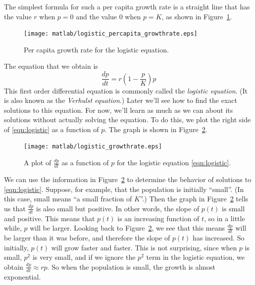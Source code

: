 The simplest formula for such a
per capita growth rate is a straight line that has
the value $r$ when $p=0$ and the value $0$ when $p=K$, as shown in
Figure~\ref{fig:growthrate}.
\begin{figure}
\centerline{\texttt{[image: matlab/logistic\_percapita\_growthrate.eps]}} 
\caption{Per capita growth rate for the logistic equation.}
\label{fig:growthrate}
\end{figure} 
The equation that we obtain is
\begin{equation}
  \frac{dp}{dt} = r\left(1-\frac{p}{K}\right)p
\label{eqn:logistic}
\end{equation}
This first order differential equation is commonly called the \emph{logistic equation}.
(It is also known as the
\emph{Verhulst equation}.)
Later we'll see how to find the exact solutions to this equation.
For now, we'll learn as much as we can about its solutions without actually solving the
equation.  To do this, we plot the right side of \eqref{eqn:logistic} as a function of $p$.
The graph is shown in Figure~\ref{fig:logisticrhs}.
\begin{figure}
\centerline{\texttt{[image: matlab/logistic\_growthrate.eps]}} 
\caption{A plot of $\frac{dp}{dt}$ as a function of $p$ for the logistic
equation \eqref{eqn:logistic}.}
\label{fig:logisticrhs}
\end{figure}
We can use the information in Figure~\ref{fig:logisticrhs} to determine the
behavior of solutions to \eqref{eqn:logistic}.
Suppose, for example, that the population is initially ``small''.
(In this case, small means ``a small fraction of $K$''.)
Then the graph in Figure~\ref{fig:logisticrhs} tells us that
$\frac{dp}{dt}$ is also small but positive.  In other words, the slope
of $p(t)$ is small and positive.  This means that $p(t)$ is an increasing
function of $t$, so in a little while, $p$ will be larger.  Looking back to
Figure~\ref{fig:logisticrhs}, we see that this means $\frac{dp}{dt}$ will be
larger than it was before, and therefore the slope of $p(t)$ has increased.
So initially, $p(t)$ will grow faster and faster.  This is not surprising, since
when $p$ is small, $p^2$ is very small, and if we ignore the $p^2$ term in the
logistic equation, we obtain $\frac{dp}{dt} \approx rp$.  So when the
population is small, the growth is almost exponential.

